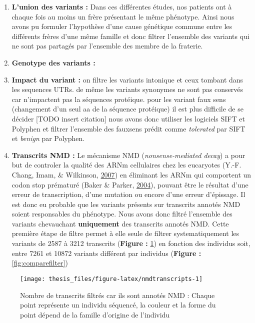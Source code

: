 \documentclass[12pt,twoside]{reedthesis}
\providecommand{\tightlist}{%
  \setlength{\itemsep}{0pt}\setlength{\parskip}{0pt}}
\theoremstyle{definition}
\theoremstyle{definition}
\theoremstyle{remark}
\begin{document}
  \begin{enumerate}
  \def\labelenumi{\arabic{enumi}.}
  \tightlist
  \item
    \textbf{L'union des variants :} Dans ces différentes études, nos
    patients ont à chaque fois au moins un frère présentant le même
    phénotype. Ainsi nous avons pu formuler l'hypothèse d'une cause
    génétique commune entre les différents frères d'une même famille et
    donc filtrer l'ensemble des variants qui ne sont pas partagés par
    l'ensemble des membre de la fraterie.\\
  \item
    \textbf{Genotype des variants :}\\
  \item
    \textbf{Impact du variant :} on filtre les variants intonique et ceux
    tombant dans les sequences UTRs. de même les variants synonymes ne
    sont pas conservés car n'impactent pas la séquences protéique. pour
    les variant faux sens (changement d'un seul aa de la séquence
    protéique) il est plus difficile de se décider {[}TODO insert
    citation{]} nous avons donc utiliser les logiciels SIFT et Polyphen et
    filtrer l'ensemble des fauxsens prédit comme \emph{tolerated} par SIFT
    et \emph{benign} par Polyphen.\\
  \item
    \textbf{Transcrits NMD :} Le mécanisme NMD (\emph{nonsense-mediated
    decay}) a pour but de controler la qualité des ARNm cellulaires chez
    les eucaryotes (Y.-F. Chang, Imam, \& Wilkinson,
    \protect\hyperlink{ref-Chang2007}{2007}) en éliminant les ARNm qui
    comportent un codon stop prématuré (Baker \& Parker,
    \protect\hyperlink{ref-Baker2004}{2004}), pouvant être le résultat
    d'une erreur de transcription, d'une mutation ou encore d'une erreur
    d'épissage. Il est donc eu probable que les variants présents sur
    transcrits annotés NMD soient responsables du phénotype. Nous avons
    donc filtré l'ensemble des variants chevauchant \textbf{uniquement}
    des transcrits annotés NMD. Cette première étape de filtre permet à
    elle seule de filtrer systematiquement les variants de 2587 à 3212
    transcrits (\textbf{Figure : }\ref{fig:nmdtranscripts}) en fonction
    des individus soit, entre 7261 et 10872 variants différent par
    individus (\textbf{Figure : }\ref{fig:comparefilter})
  \end{enumerate}
  
  \begin{figure}
  
  {\centering \texttt{[image: thesis\_files/figure-latex/nmdtranscripts-1]} 
  
  }
  
  \caption[Nombre de transcrits filtrés car ils sont annotés NMD]{Nombre de transcrits filtrés car ils sont annotés NMD : Chaque point représente un individu séquencé, la couleur et la forme du point dépend de la famille d'origine de l'individu}\label{fig:nmdtranscripts}
  \end{figure}
  
\end{document}
